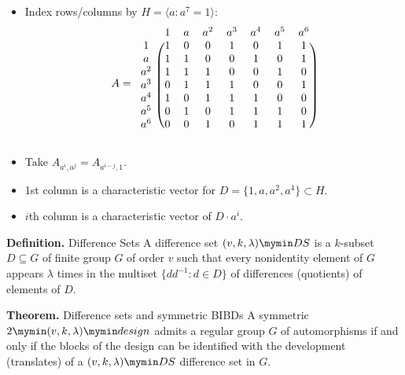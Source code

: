 \documentclass{beamer}
\newcommand{\bibd}[1]{2 \mymin #1 \mymin design}
\newcommand{\ds}[1]{#1 \mymin DS}
\begin{document}
\begin{frame}

  \begin{itemize}
  \item Index rows/columns by $H=\langle a : a^7=1 \rangle$:
    \[
      A=
      \begin{blockarray}{cccccccc}
        & 1 & a & a^2 & a^3 & a^4 & a^5 & a^6 \\
        \begin{block}{c(ccccccc)}
          1   &1&0&0&1&0&1&1\\
          a   &1&1&0&0&1&0&1\\
          a^2 &1&1&1&0&0&1&0\\
          a^3 &0&1&1&1&0&0&1\\
          a^4 &1&0&1&1&1&0&0\\
          a^5 &0&1&0&1&1&1&0\\
          a^6 &0&0&1&0&1&1&1\\
        \end{block}
      \end{blockarray}
    \]
  \item Take $A_{a^i,a^j}=A_{a^{i-j},1}$.
  \item 1st column is a characteristic vector for $D=\{1,a,a^2,a^4\} \subset H$.
  \item $i$th column is a characteristic vector of $D \cdot a^i$.
  \end{itemize}

\end{frame}

\begin{frame}

  \begin{block}{{\bf Definition.} Difference Sets}
    A difference set $\ds{(v,k,\lambda)}$ is a $k$-subset $D \subseteq G$ of finite
    group $G$ of order $v$ such that every nonidentity element of $G$ appears
    $\lambda$ times in the multiset $\{dd^{-1} : d \in D\}$ of differences
    (quotients) of elements of $D$.
  \end{block}

  \begin{block}{{\bf Theorem.} Difference sets and symmetric BIBDs}
    A symmetric $\bibd{(v,k,\lambda)}$ admits a regular group $G$ of automorphisms
    if and only if the blocks of the design can be identified with the
    development (translates) of a $\ds{(v,k,\lambda)}$ difference set in $G$.
  \end{block}

\end{frame}
\end{document}
